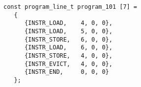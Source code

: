 \begin{lstlisting}
const program_line_t program_101 [7] =
   {
      {INSTR_LOAD,    4, 0, 0},
      {INSTR_LOAD,    5, 0, 0},
      {INSTR_STORE,   6, 0, 0},
      {INSTR_LOAD,    6, 0, 0},
      {INSTR_STORE,   4, 0, 0},
      {INSTR_EVICT,   4, 0, 0},
      {INSTR_END,     0, 0, 0}
   };
\end{lstlisting}
